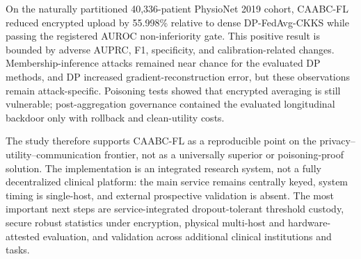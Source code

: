 \documentclass[conference]{IEEEtran}
\begin{document}
On the naturally partitioned 40,336-patient PhysioNet 2019 cohort, CAABC-FL
reduced encrypted upload by 55.998\% relative to dense DP-FedAvg-CKKS while
passing the registered AUROC non-inferiority gate. This positive result is
bounded by adverse AUPRC, F1, specificity, and calibration-related changes.
Membership-inference attacks remained near chance for the evaluated DP methods,
and DP increased gradient-reconstruction error, but these observations remain
attack-specific. Poisoning tests showed that encrypted averaging is still
vulnerable; post-aggregation governance contained the evaluated longitudinal
backdoor only with rollback and clean-utility costs.

The study therefore supports CAABC-FL as a reproducible point on the
privacy--utility--communication frontier, not as a universally superior or
poisoning-proof solution. The implementation is an integrated research system,
not a fully decentralized clinical platform: the main service remains centrally
keyed, system timing is single-host, and external prospective validation is
absent. The most important next steps are service-integrated dropout-tolerant
threshold custody, secure robust statistics under encryption, physical
multi-host and hardware-attested evaluation, and validation across additional
clinical institutions and tasks.

\balance


\end{document}
